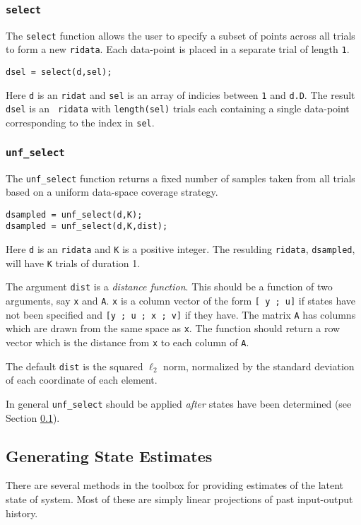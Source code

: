 \documentclass{article}
\begin{document}
\subsubsection{{\tt select}}
The {\tt select} function allows the user to specify a subset of points
across all trials to form a new {\tt ridata}.  Each data-point is
placed in a separate trial of length {\tt 1}.

\begin{verbatim}
dsel = select(d,sel);
\end{verbatim}

Here {\tt d} is an {\tt ridat} and {\tt sel} is an array of indicies
between {\tt 1} and {\tt d.D}.  The result {\tt dsel} is an {\tt
  ridata} with {\tt length(sel)} trials each containing a single
data-point corresponding to the index in {\tt sel}.


\subsubsection{{\tt unf\_select}}
The {\tt unf\_select} function returns a fixed number of samples taken from
all trials based on a uniform data-space coverage strategy.

\begin{verbatim}
dsampled = unf_select(d,K);
dsampled = unf_select(d,K,dist);
\end{verbatim}

Here {\tt d} is an {\tt ridata} and {\tt K} is a positive integer.
The resulding {\tt ridata}, {\tt dsampled}, will have {\tt K} trials
of duration 1. 

 The argument {\tt dist} is a {\it distance function}.
 This should be a function of two arguments, say {\tt x} and {\tt A}.
 {\tt x} is a column vector of the form {\tt [ y ; u]} if states have
 not been specified and {\tt [y ; u ; x ; v]} if they have.  The
 matrix {\tt A} has columns which are drawn from the same space as
 {\tt x}.  The function should return a row vector which is the
 distance from {\tt x} to each column of {\tt A}.

 The default {\tt dist} is the squared $\ell_2$ norm, normalized by
 the standard deviation of each coordinate of each element.
 
 In general {\tt unf\_select} should be applied {\it after}
states have been determined (see Section \ref{states}).

\subsection{Generating State Estimates}
\label{states}
There are several methods in the toolbox for providing estimates of
the latent state of system.  Most of these are simply linear
projections of past input-output history.  
\end{document}
